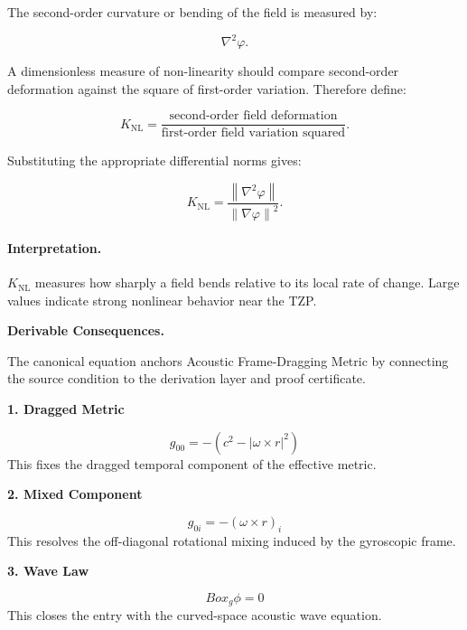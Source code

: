 The second-order curvature or bending of the field is measured by:

\begin{equation}
\nabla^2\varphi .
\end{equation}

A dimensionless measure of non-linearity should compare second-order deformation against the square of first-order variation. Therefore define:

\begin{equation}
K_{\mathrm{NL}}
=
\frac{\text{second-order field deformation}}
{\text{first-order field variation squared}} .
\end{equation}

Substituting the appropriate differential norms gives:

\begin{equation}
\boxed{
K_{\mathrm{NL}}
=
\frac{\left\lVert \nabla^{2}\varphi\right\rVert}
{\left\lVert \nabla\varphi\right\rVert^{2}} .
}
\end{equation}

\paragraph{Interpretation.}
$K_{\mathrm{NL}}$ measures how sharply a field bends relative to its local rate of change. Large values indicate strong nonlinear behavior near the TZP.

\par\vspace{0.35em}
\noindent\textbf{Derivable Consequences.}\quad
\begingroup
\footnotesize
\raggedright
The canonical equation anchors Acoustic Frame-Dragging Metric by connecting the source condition to the derivation layer and proof certificate.
\par\endgroup

\noindent\textbf{1. Dragged Metric}\par
\[
g_{00} = -\left(c^2 - \lvert \omega \times r \rvert^2\right)
\]
\noindent This fixes the dragged temporal component of the effective metric.\par
\noindent\textbf{2. Mixed Component}\par
\[
g_{0i} = -(\omega \times r)_i
\]
\noindent This resolves the off-diagonal rotational mixing induced by the gyroscopic frame.\par
\noindent\textbf{3. Wave Law}\par
\[
Box_g \phi = 0
\]
\noindent This closes the entry with the curved-space acoustic wave equation.\par

